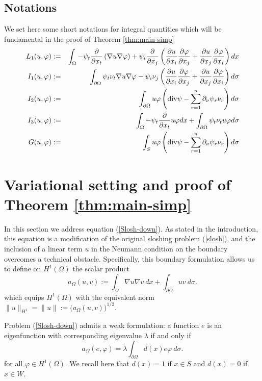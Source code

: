 \documentclass[a4paper,reqno,11pt,oneside]{amsart}
\theoremstyle{plain}
\theoremstyle{plain}
\theoremstyle{plain}
\theoremstyle{remark}
\def\div{\textup{div}}
\begin{document}
\subsection{Notations}\label{sec:not}
We set here some short notations for integral quantities which will be fundamental in the proof of Theorem \ref{thm:main-simp} 
\begin{eqnarray*}
    L_1(u,\varphi)&:=&\int_\Omega-\psi_t \frac{\partial}{\partial x_t} \left(\nabla u\nabla \varphi\right) + \psi_i\frac{\partial }{ \partial x_j}\left(\frac{\partial u}{\partial x_i}\frac{\partial \varphi}{\partial x_j}+
\frac{\partial u}{\partial x_j}\frac{\partial \varphi}{\partial x_i}
\right) dx\\
  I_1(u,\varphi)&:=&\int_{\partial\Omega}\psi_t \nu_t \nabla u\nabla \varphi -
\psi_i \nu_j\left(\frac{\partial u}{\partial x_i}\frac{\partial \varphi}{\partial x_j}+\frac{\partial u}{\partial x_j}\frac{\partial \varphi}{\partial x_i}
\right) d\sigma\\
  I_2( u,\varphi)&:=&\int_{\partial \Omega} u\varphi \left(\div \psi -\sum_{r=1}^n \partial_\nu \psi_r \nu_r\right) d\sigma\\
   I_3( u,\varphi)&:=&  
\int_\Omega-\psi_t \frac{\partial}{\partial x_t}  u \varphi  dx
+\int_{\partial\Omega}\psi_t \nu_t  u \varphi d\sigma
   \\
      G(u,\varphi)&:=&\int_{ S} u\varphi \left(\div \psi -\sum_{r=1}^n \partial_\nu \psi_r \nu_r\right) d\sigma
 \end{eqnarray*}




\section{Variational setting and proof of Theorem \ref{thm:main-simp}}\label{sec:sloshsimp}

In this section we address equation (\ref{Slosh-down}).
As stated in the introduction, this equation is a modification of the original sloshing problem (\ref{slosh}), and the inclusion of a linear term $u$ in the Neumann condition on the boundary overcomes a technical obstacle.  Specifically, this boundary formulation allows us to define on $H^1(\Omega)$ the scalar product
\[
a_{\Omega}(u,v):=\int_\Omega \nabla u \nabla v \ dx +\int_{\partial \Omega} uv\ d\sigma .
\]
which equips $H^1(\Omega)$ with the equivalent norm $\| u\|_{H^1}=\|u\|:=\big(a_{\Omega}(u,v)\big)^{1/2}$. 

Problem  (\ref{Slosh-down}) admits a weak formulation: a function $e$ is an eigenfunction with corresponding eigenvalue $\lambda$ if and only if 
\begin{equation}\label{eq:weaksimp}
    a_{\Omega}(e,\varphi)=\lambda\int_{\partial \Omega} d(x)e\varphi\ d\sigma .
\end{equation}
for all $\varphi\in H^1(\Omega)$. We recall here that $d(x)=1$ if $x\in S$ and $d(x)=0$ if $x\in W$.
\end{document}
